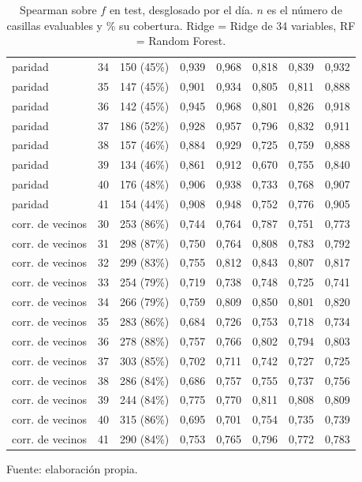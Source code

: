 \begin{table}[htbp]
{\begin{tabular}{@{}lrrrrrrr@{}}
        paridad & 34 & 150 (45\%) & 0,939 & 0,968 & 0,818 & 0,839 & 0,932 \\
        paridad & 35 & 147 (45\%) & 0,901 & 0,934 & 0,805 & 0,811 & 0,888 \\
        paridad & 36 & 142 (45\%) & 0,945 & 0,968 & 0,801 & 0,826 & 0,918 \\
        paridad & 37 & 186 (52\%) & 0,928 & 0,957 & 0,796 & 0,832 & 0,911 \\
        paridad & 38 & 157 (46\%) & 0,884 & 0,929 & 0,725 & 0,759 & 0,888 \\
        paridad & 39 & 134 (46\%) & 0,861 & 0,912 & 0,670 & 0,755 & 0,840 \\
        paridad & 40 & 176 (48\%) & 0,906 & 0,938 & 0,733 & 0,768 & 0,907 \\
        paridad & 41 & 154 (44\%) & 0,908 & 0,948 & 0,752 & 0,776 & 0,905 \\
        corr. de vecinos & 30 & 253 (86\%) & 0,744 & 0,764 & 0,787 & 0,751 & 0,773 \\
        corr. de vecinos & 31 & 298 (87\%) & 0,750 & 0,764 & 0,808 & 0,783 & 0,792 \\
        corr. de vecinos & 32 & 299 (83\%) & 0,755 & 0,812 & 0,843 & 0,807 & 0,817 \\
        corr. de vecinos & 33 & 254 (79\%) & 0,719 & 0,738 & 0,748 & 0,725 & 0,741 \\
        corr. de vecinos & 34 & 266 (79\%) & 0,759 & 0,809 & 0,850 & 0,801 & 0,820 \\
        corr. de vecinos & 35 & 283 (86\%) & 0,684 & 0,726 & 0,753 & 0,718 & 0,734 \\
        corr. de vecinos & 36 & 278 (88\%) & 0,757 & 0,766 & 0,802 & 0,794 & 0,803 \\
        corr. de vecinos & 37 & 303 (85\%) & 0,702 & 0,711 & 0,742 & 0,727 & 0,725 \\
        corr. de vecinos & 38 & 286 (84\%) & 0,686 & 0,757 & 0,755 & 0,737 & 0,756 \\
        corr. de vecinos & 39 & 244 (84\%) & 0,775 & 0,770 & 0,811 & 0,808 & 0,809 \\
        corr. de vecinos & 40 & 315 (86\%) & 0,695 & 0,701 & 0,754 & 0,735 & 0,739 \\
        corr. de vecinos & 41 & 290 (84\%) & 0,753 & 0,765 & 0,796 & 0,772 & 0,783 \\
        \bottomrule
    \end{tabular}}

    \caption{Spearman sobre $f$ en test, desglosado por el día. $n$ es el número de casillas evaluables y \% su cobertura. Ridge = Ridge de 34 variables, RF = Random Forest.}
    \label{tab:v3_tiempo_spearman}

    {\footnotesize Fuente: elaboración propia.}
\end{table}

